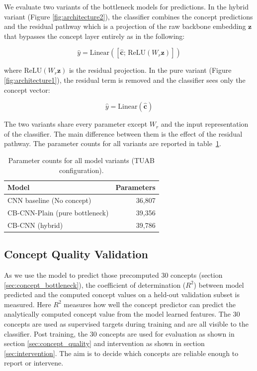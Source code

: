 \documentclass[journal,twoside,web]{ieeecolor}
\begin{document}
We evaluate two variants of the bottleneck models for predictions. In the hybrid variant (Figure \ref{fig:architecture2}), the classifier combines the concept predictions and the residual pathway which is a projection of the raw backbone embedding $\mathbf{z}$ that bypasses the concept layer entirely as in the following:

\begin{equation}
  \hat{y} = \mathrm{Linear}([\hat{\mathbf{c}};\, \mathrm{ReLU}(W_r\mathbf{z})])
  \label{eq:classifier}
\end{equation}

where $\mathrm{ReLU}(W_r\mathbf{z})$ is the residual projection. In the pure variant (Figure \ref{fig:architecture1}), the residual term is removed and the classifier sees only the concept vector:

\begin{equation}
  \hat{y} = \mathrm{Linear}(\hat{\mathbf{c}})
  \label{eq:classifier_plain}
\end{equation}

The two variants share every parameter except $W_r$ and the input representation of the classifier. The main difference between them is the effect of the residual pathway. The parameter counts for all variants are reported in table~\ref{tab:params}.

\begin{table}[h]
\caption{Parameter counts for all model variants (TUAB configuration).}
\centering
\begin{tabular}{l r}
\hline
Model & Parameters \\
\hline
CNN baseline (No concept) & 36,807 \\
CB-CNN-Plain (pure bottleneck)  & 39,356 \\
CB-CNN (hybrid)                      & 39,786 \\
\hline
\end{tabular}
\label{tab:params}
\end{table}


\subsection{Concept Quality Validation}
\label{sec:validation}

As we use the model to predict those precomputed $30$ concepts (section \ref{sec:concept_bottleneck}), the coefficient of determination ($R^2$) between model predicted and the computed concept values on a held-out validation subset is measured. Here $R^2$ measures how well the concept predictor can predict the analytically computed concept value from the model learned features. The $30$ concepts are used as supervised targets during training and are all visible to the classifier. Post training, the $30$ concepts are used for evaluation as shown in section \ref{sec:concept_quality} and intervention as shown in section \ref{sec:intervention}. The aim is to decide which concepts are reliable enough to report or intervene.
\end{document}
